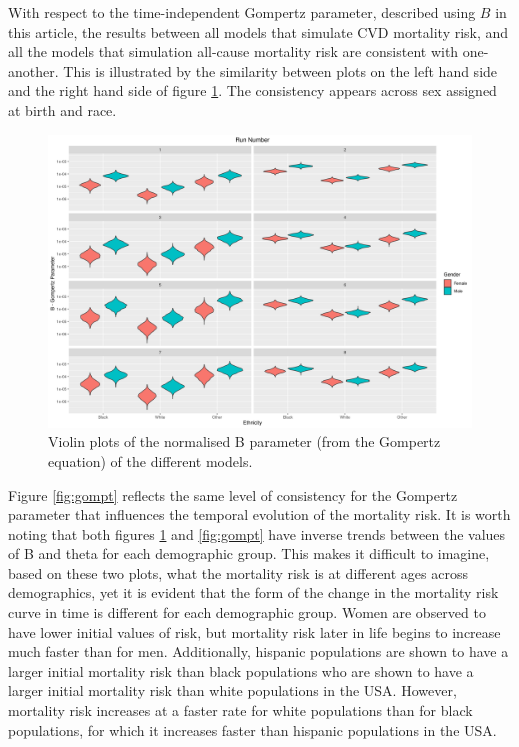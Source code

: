 \documentclass[
]{article}
\begin{document}
With respect to the time-independent Gompertz parameter, described using
\(B\) in this article, the results between all models that simulate CVD
mortality risk, and all the models that simulation all-cause mortality
risk are consistent with one-another. This is illustrated by the
similarity between plots on the left hand side and the right hand side
of figure \ref{fig:gompB}. The consistency appears across sex assigned
at birth and race.

\begin{figure}
\hypertarget{fig:gompB}{%
\centering
\includegraphics{./Plots/gompertz/B_parameter.png}
\caption{Violin plots of the normalised B parameter (from the Gompertz
equation) of the different models.}\label{fig:gompB}
}
\end{figure}

Figure \ref{fig:gompt} reflects the same level of consistency for the
Gompertz parameter that influences the temporal evolution of the
mortality risk. It is worth noting that both figures \ref{fig:gompB} and
\ref{fig:gompt} have inverse trends between the values of B and theta
for each demographic group. This makes it difficult to imagine, based on
these two plots, what the mortality risk is at different ages across
demographics, yet it is evident that the form of the change in the
mortality risk curve in time is different for each demographic group.
Women are observed to have lower initial values of risk, but mortality
risk later in life begins to increase much faster than for men.
Additionally, hispanic populations are shown to have a larger initial
mortality risk than black populations who are shown to have a larger
initial mortality risk than white populations in the USA. However,
mortality risk increases at a faster rate for white populations than for
black populations, for which it increases faster than hispanic
populations in the USA.
\end{document}
